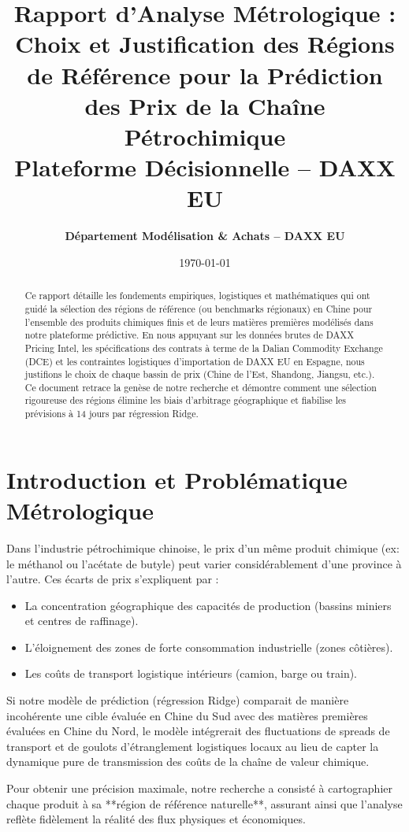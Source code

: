 \documentclass[12pt,a4paper]{article}
\title{\textbf{Rapport d'Analyse Métrologique : Choix et Justification des Régions de Référence pour la Prédiction des Prix de la Chaîne Pétrochimique\\ Plateforme Décisionnelle -- DAXX EU}}
\author{\textbf{Département Modélisation \& Achats -- DAXX EU}}
\date{\today}
\begin{document}
\maketitle
\tableofcontents
\newpage

\begin{abstract}
Ce rapport détaille les fondements empiriques, logistiques et mathématiques qui ont guidé la sélection des régions de référence (ou benchmarks régionaux) en Chine pour l'ensemble des produits chimiques finis et de leurs matières premières modélisés dans notre plateforme prédictive. En nous appuyant sur les données brutes de DAXX Pricing Intel, les spécifications des contrats à terme de la Dalian Commodity Exchange (DCE) et les contraintes logistiques d'importation de DAXX EU en Espagne, nous justifions le choix de chaque bassin de prix (Chine de l'Est, Shandong, Jiangsu, etc.). Ce document retrace la genèse de notre recherche et démontre comment une sélection rigoureuse des régions élimine les biais d'arbitrage géographique et fiabilise les prévisions à 14 jours par régression Ridge.
\end{abstract}

\section{Introduction et Problématique Métrologique}
Dans l'industrie pétrochimique chinoise, le prix d'un même produit chimique (ex: le méthanol ou l'acétate de butyle) peut varier considérablement d'une province à l'autre. Ces écarts de prix s'expliquent par :
\begin{itemize}
    \item La concentration géographique des capacités de production (bassins miniers et centres de raffinage).
    \item L'éloignement des zones de forte consommation industrielle (zones côtières).
    \item Les coûts de transport logistique intérieurs (camion, barge ou train).
\end{itemize}

Si notre modèle de prédiction (régression Ridge) comparait de manière incohérente une cible évaluée en Chine du Sud avec des matières premières évaluées en Chine du Nord, le modèle intégrerait des fluctuations de spreads de transport et de goulots d'étranglement logistiques locaux au lieu de capter la dynamique pure de transmission des coûts de la chaîne de valeur chimique. 

Pour obtenir une précision maximale, notre recherche a consisté à cartographier chaque produit à sa **région de référence naturelle**, assurant ainsi que l'analyse reflète fidèlement la réalité des flux physiques et économiques.
\end{document}
